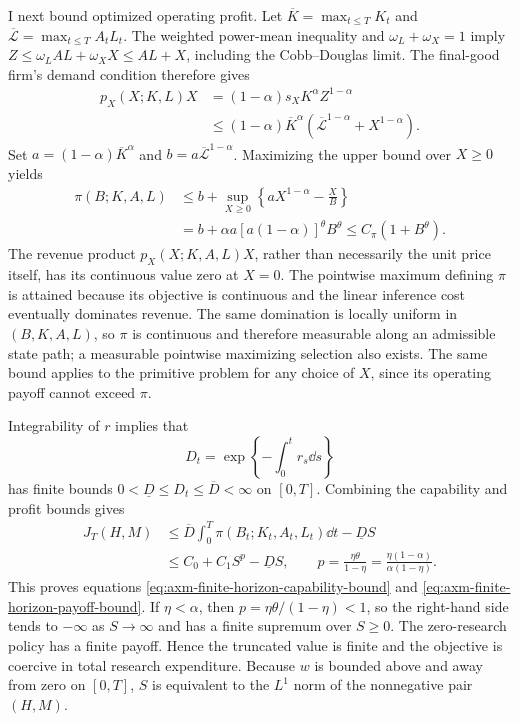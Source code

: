 I next bound optimized operating profit. Let
\(\overline K=\max_{t\leq T}K_t\) and
\(\overline{\mathcal L}=\max_{t\leq T}A_tL_t\). The weighted power-mean inequality and
\(\omega_L+\omega_X=1\) imply
\(Z\leq\omega_LAL+\omega_XX\leq AL+X\), including
the Cobb--Douglas limit. The final-good firm's demand
condition therefore gives
\begin{align*}
 p_X(X;K,L)X
 &=(1-\alpha)s_XK^\alpha Z^{1-\alpha}\\
 &\leq(1-\alpha)\overline K^\alpha
       \left(\overline{\mathcal L}^{1-\alpha}+X^{1-\alpha}\right).
\end{align*}
Set \(a=(1-\alpha)\overline K^\alpha\) and
\(b=a\overline{\mathcal L}^{1-\alpha}\). Maximizing the upper bound over \(X\geq0\)
yields
\begin{align*}
 \pi(B;K,A,L)
 &\leq b+\sup_{X\geq0}\left\{aX^{1-\alpha}-\frac{X}{B}\right\}\\
 &=b+\alpha a[a(1-\alpha)]^\theta B^\theta
 \leq C_\pi(1+B^\theta).
\end{align*}
The revenue product \(p_X(X;K,A,L)X\), rather than necessarily the unit price
itself, has its continuous value zero at \(X=0\). The pointwise maximum defining
\(\pi\) is attained because its objective is continuous and the linear inference
cost eventually dominates revenue. The same domination is locally uniform in
\((B,K,A,L)\), so \(\pi\) is continuous
and therefore measurable along an admissible state path; a measurable
pointwise maximizing selection also exists. The
same bound applies to the primitive problem for any choice of \(X\), since its
operating payoff cannot exceed \(\pi\).

Integrability of \(r\) implies that
\[
 D_t=\exp\left\{-\int_0^t r_s\dd s\right\}
\]
has finite bounds \(0<\underline D\leq D_t\leq\overline D<\infty\) on
\([0,T]\). Combining the capability and profit bounds gives
\begin{align}
 J_T(H,M)
 &\leq \overline D\int_0^T\pi(B_t;K_t,A_t,L_t)\dd t
       -\underline DS\\
 &\leq C_0+C_1S^p-\underline DS,
 \qquad
 p=\frac{\eta\theta}{1-\eta}
  =\frac{\eta(1-\alpha)}{\alpha(1-\eta)}.
 \label{eq:axm-finite-horizon-payoff-bound}
\end{align}
This proves equations \eqref{eq:axm-finite-horizon-capability-bound} and
\eqref{eq:axm-finite-horizon-payoff-bound}. If \(\eta<\alpha\), then
\(p=\eta\theta/(1-\eta)<1\), so the right-hand side tends to \(-\infty\)
as \(S\to\infty\) and has a finite supremum over \(S\geq0\). The zero-research
policy has a finite payoff. Hence the truncated value is finite and the
objective is coercive in total research expenditure. Because \(w\) is bounded
above and away from zero on \([0,T]\), \(S\) is equivalent to the
\(L^1\) norm of the nonnegative pair \((H,M)\).

